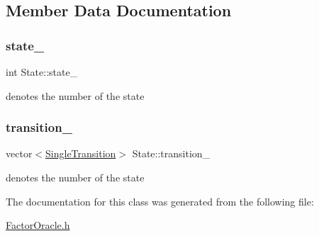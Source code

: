 \subsection{Member Data Documentation}
\mbox{\label{class_state_a2dcf672a1560830a8f93b0e9863c6724}} 
\subsubsection{\texorpdfstring{state\_}{state\_}}
{\footnotesize\ttfamily int State\+::state\+\_\+}

denotes the number of the state \mbox{\label{class_state_afd5b3d2afbba2fc03583f76a7cb08fe8}} 
\subsubsection{\texorpdfstring{transition\_}{transition\_}}
{\footnotesize\ttfamily vector$<$\mbox{\hyperlink{class_single_transition}{Single\+Transition}}$>$ State\+::transition\+\_\+}

denotes the number of the state 

The documentation for this class was generated from the following file\+:\begin{DoxyCompactItemize}
\item 
\mbox{\hyperlink{_factor_oracle_8h}{Factor\+Oracle.\+h}}\end{DoxyCompactItemize}

